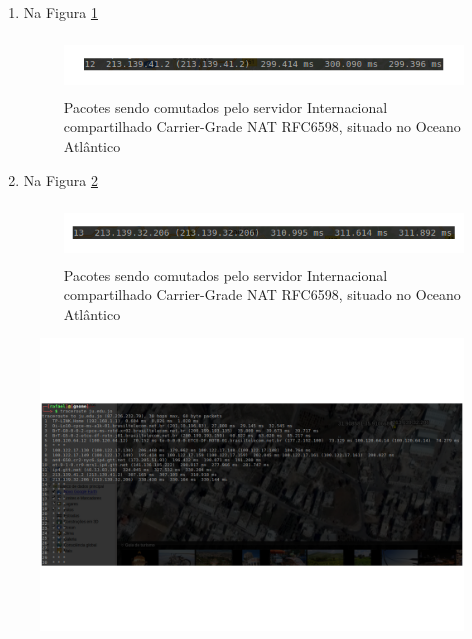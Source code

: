 \documentclass[
	article,			%
	11pt,				%
	oneside,			%
	a4paper,			%
	english,			%
	brazil,				%
	sumario=tradicional
	]{abntex2}
\begin{document}
\begin{enumerate}
	 	 \item Na Figura \ref{rota-12}
	 	
	 	\begin{figure}[H]
	 		\centering
	 		\includegraphics[width=17cm,height=1.5cm]{./rota-12.png}
	 		\caption{Pacotes sendo comutados pelo servidor Internacional compartilhado Carrier-Grade NAT RFC6598, situado no Oceano Atlântico}
	 		\label{rota-12}
	 	\end{figure}
 	
	 	 \item Na Figura \ref{rota-13}
	 	
	 	\begin{figure}[H]
	 		\centering
	 		\includegraphics[width=17cm,height=1.5cm]{./rota-13.png}
	 		\caption{Pacotes sendo comutados pelo servidor Internacional compartilhado Carrier-Grade NAT RFC6598, situado no Oceano Atlântico}
	 		\label{rota-13}
	 	\end{figure}
 \end{enumerate}

	 
\begin{figure}[H]
	\centering
	\includegraphics[scale=0.1]{./trauceroute-1.png}

	\label{Rotulo}
\end{figure}
\end{document}
